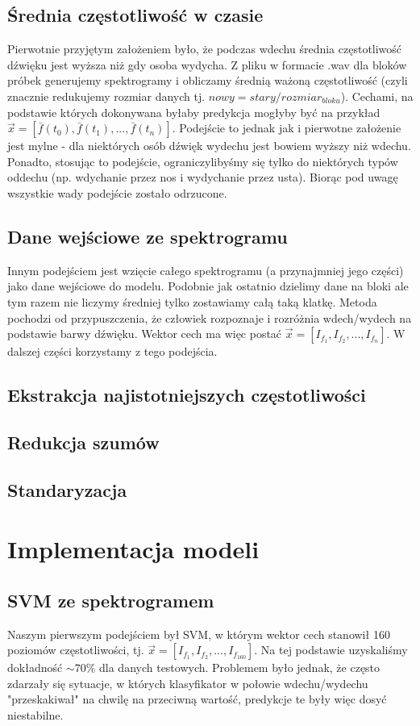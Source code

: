 \documentclass{article}
\begin{document}
\subsection{Średnia częstotliwość w czasie}
Pierwotnie przyjętym założeniem było, że podczas wdechu średnia częstotliwość dźwięku jest wyższa niż
gdy osoba wydycha. Z pliku w formacie .wav dla bloków próbek generujemy spektrogramy i obliczamy
średnią ważoną częstotliwość (czyli znacznie redukujemy rozmiar danych tj. $nowy = stary/rozmiar_{bloku}$).
Cechami, na podstawie których
dokonywana byłaby predykcja mogłyby być na przykład $\vec{x} = [\bar{f}(t_0), \bar{f}(t_1), ..., \bar{f}(t_n)]$.
Podejście to jednak jak i pierwotne założenie jest mylne - dla niektórych osób 
dźwięk wydechu jest bowiem wyższy
niż wdechu. Ponadto, stosując to podejście, ograniczylibyśmy się tylko do niektórych typów oddechu (np. 
wdychanie przez nos i wydychanie przez usta).  Biorąc pod uwagę wszystkie wady podejście zostało odrzucone.
\subsection{Dane wejściowe ze spektrogramu}
Innym podejściem jest wzięcie całego spektrogramu (a przynajmniej jego części) jako dane wejściowe do 
modelu.  Podobnie jak ostatnio dzielimy dane na bloki ale tym razem nie liczymy średniej tylko zostawiamy
całą taką klatkę.
Metoda pochodzi od przypuszczenia, że człowiek rozpoznaje i rozróżnia wdech/wydech
na podstawie barwy dźwięku.  Wektor cech ma więc postać $\vec{x} = [I_{f_1}, I_{f_2}, ..., I_{f_n}]$.
W dalszej części korzystamy z tego podejścia.
\subsection{Ekstrakcja najistotniejszych częstotliwości}
\subsection{Redukcja szumów}
\subsection{Standaryzacja}

\section{Implementacja modeli}
\subsection{SVM ze spektrogramem}
Naszym pierwszym podejściem był SVM, w którym wektor cech stanowił 160 poziomów częstotliwości, 
tj. $\vec{x} = [I_{f_1}, I_{f_2}, ..., I_{f_160}]$.  Na tej podstawie uzyskaliśmy dokładność $\sim 70\%$ dla danych testowych. 
Problemem było jednak, że często zdarzały się sytuacje, w których klasyfikator w połowie wdechu/wydechu "przeskakiwał" 
na chwilę na przeciwną wartość, predykcje te były więc dosyć niestabilne.
\end{document}
